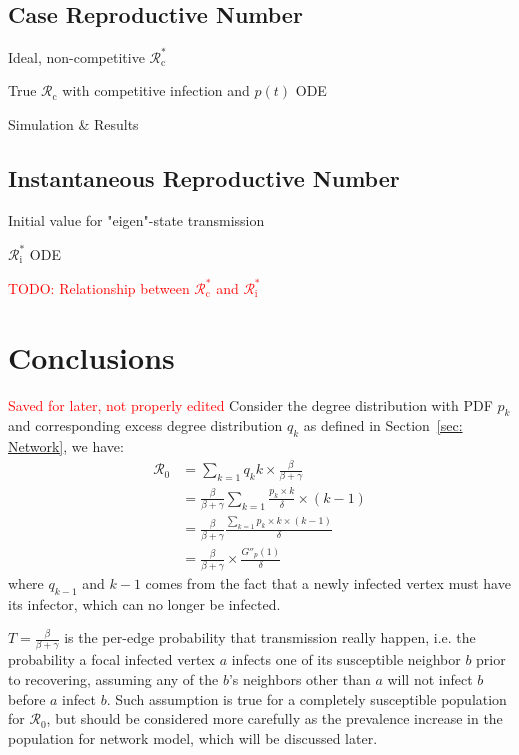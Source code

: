 \documentclass[12pt]{article}
\theoremstyle{plain}
\theoremstyle{definition}
\begin{document}
\subsection{Case Reproductive Number}

Ideal, non-competitive $\mathcal{R}^*_\text{c}$

True $\mathcal{R}_\text{c}$ with competitive infection and $p(t)$ ODE

Simulation \& Results

\subsection{Instantaneous Reproductive Number}

Initial value for "eigen"-state transmission

$\mathcal{R}^*_\text{i}$ ODE

\textcolor{red}{TODO: Relationship between $\mathcal{R}^*_\text{c}$ and $\mathcal{R}^*_\text{i}$}


\section{Conclusions}
\label{sec: Conclusion}



\textcolor{red}{Saved for later, not properly edited}
Consider the degree distribution with PDF $p_k$ and corresponding excess degree distribution $q_k$ as defined in Section~\ref{sec: Network}, we have: 
\begin{align}
	\mathcal{R}_{0}&=\sum_{k=1} q_{k} k\times \frac{\beta}{\beta+\gamma}
	\\
	&= \frac{\beta}{\beta+\gamma} \sum_{k=1} \frac{p_k \times k}{\delta} \times(k-1)
	\\
	&=\frac{\beta}{\beta+\gamma} \frac{\sum_{k=1} p_k \times k \times(k-1)}{\delta}
	\\
	&=\frac{\beta}{\beta+\gamma} \times\frac{G''_p(1)}{\delta}
\end{align}
where $q_{k-1}$ and $k-1$ comes from the fact that a newly infected vertex must have its infector, which can no longer be infected.

$T=\frac{\beta}{\beta+\gamma}$ is the per-edge probability that transmission really happen, i.e. the probability a focal infected vertex $a$ infects one of its susceptible neighbor $b$ prior to recovering, assuming any of the $b$'s neighbors other than $a$ will not infect $b$ before $a$ infect $b$.
Such assumption is true for a completely susceptible population for $\mathcal{R}_0$, but should be considered more carefully as the prevalence increase in the population for network model, which will be discussed later.
\end{document}
